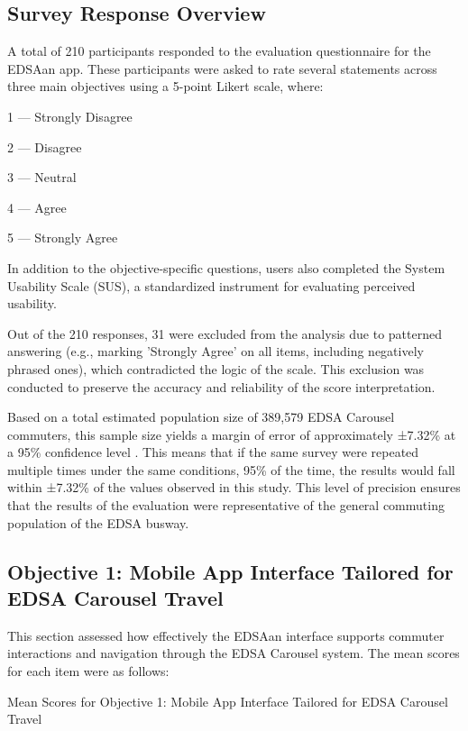 \documentclass{icsthesis}
\begin{document}
\begin{mainmatter}
\subsection{Survey Response Overview}

A total of 210 participants responded to the evaluation questionnaire for the EDSAan app. These participants were asked to rate several statements across three main objectives using a 5-point Likert scale, where:

1 — Strongly Disagree

2 — Disagree

3 — Neutral

4 — Agree

5 — Strongly Agree

In addition to the objective-specific questions, users also completed the System Usability Scale (SUS), a standardized instrument for evaluating perceived usability.

Out of the 210 responses, 31 were excluded from the analysis due to patterned answering (e.g., marking 'Strongly Agree' on all items, including negatively phrased ones), which contradicted the logic of the scale. This exclusion was conducted to preserve the accuracy and reliability of the score interpretation.

Based on a total estimated population size of 389,579 EDSA Carousel commuters, this sample size yields a margin of error of approximately ±7.32\% at a 95\% confidence level \citep{Ref:020}. This means that if the same survey were repeated multiple times under the same conditions, 95\% of the time, the results would fall within ±7.32\% of the values observed in this study. This level of precision ensures that the results of the evaluation were representative of the general commuting population of the EDSA busway.

\subsection{Objective 1: Mobile App Interface Tailored for EDSA Carousel Travel}
This section assessed how effectively the EDSAan interface supports commuter interactions and navigation through the EDSA Carousel system. The mean scores for each item were as follows:

			\begin{table}[ht]
			\vspace{4ex}
			\centering
				\caption{Mean Scores for Objective 1: Mobile App Interface Tailored for EDSA Carousel Travel}
				

\end{table}
\end{mainmatter}
\end{document}
